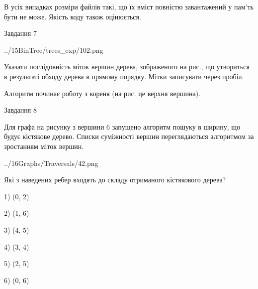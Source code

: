 \documentclass[12pt, ukrainian]{article}
\begin{document}
{В усіх випадках розміри файлів такі, що їх вміст повністю завантажений у пам'ть бути не може. Якість коду також оцінюється.



\vspace{10mm}\par

\newpage
\begin{minipage}[t]{9.7cm}
               
{\begin{center}Завдання {7}\end{center}}
\vspace{-4mm}

\begin{center}
	{../15BinTree/trees_exp/102.png}
\end{center}
Указати послідовність міток вершин дерева, зображеного на рис., що утвориться в результаті обходу дерева в прямому порядку. Мітки записувати через пробіл.\par Алгоритм починає роботу з кореня (на рис. це верхня вершина).\par

\end{minipage}
\vline \hspace{8mm}
\begin{minipage}[t]{8.0cm}
               
{\begin{center}Завдання {8}\end{center}}
\vspace{-4mm}
Для графа на рисунку з вершини 6 запущено алгоритм пошуку в ширину, що будує кістякове дерево. Списки суміжності вершин переглядаються алгоритмом за зростанням міток вершин.\par
\begin{center}
	{../16Graphs/Traversals/42.png}
\end{center}
\par Які з наведених ребер входять до складу отриманого кістякового дерева?\par
1) (0, 2)\par
2) (1, 6)\par
3) (4, 5)\par
4) (3, 4)\par
5) (2, 5)\par
6) (0, 6)\par
{\vskip 15pt} \par


\end{minipage}}
\end{document}
